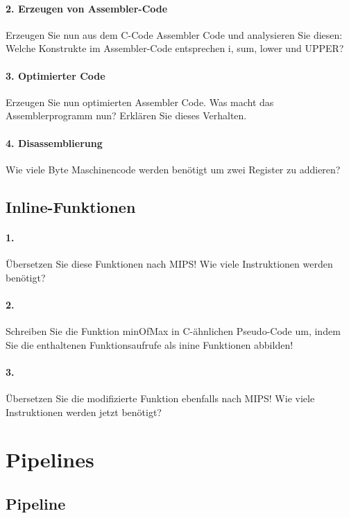 \documentclass[paper=a4, fontsize=11pt]{scrartcl}
\numberwithin{equation}{section}
\numberwithin{figure}{section}
\numberwithin{table}{section}
\begin{document}
\paragraph{2. Erzeugen von Assembler-Code}
Erzeugen Sie nun aus dem C-Code Assembler Code und analysieren Sie diesen: Welche Konstrukte im Assembler-Code entsprechen i, sum, lower und UPPER?

\paragraph{3. Optimierter Code}
Erzeugen Sie nun optimierten Assembler Code. Was macht das Assemblerprogramm nun? Erklären Sie dieses Verhalten.

\paragraph{4. Disassemblierung}
Wie viele Byte Maschinencode werden benötigt um zwei Register zu addieren?

\subsection{Inline-Funktionen}

\paragraph{1.}
Übersetzen Sie diese Funktionen nach MIPS! Wie viele Instruktionen werden benötigt?

\paragraph{2.}
Schreiben Sie die Funktion minOfMax in C-ähnlichen Pseudo-Code um, indem Sie die enthaltenen Funktionsaufrufe als inine Funktionen abbilden!

\paragraph{3.}
Übersetzen Sie die modifizierte Funktion ebenfalls nach MIPS! Wie viele Instruktionen werden jetzt benötigt?

\section{Pipelines}
\subsection{Pipeline}
\end{document}
